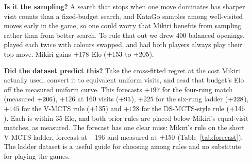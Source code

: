 \documentclass{article}
\begin{document}
\textbf{Is it the sampling?} A search that stops when one move dominates has sharper visit counts than a fixed-budget search, and KataGo samples among well-visited moves early in the game, so one could worry that Mikiri benefits from sampling rather than from better search. To rule that out we drew 400 balanced openings, played each twice with colours swapped, and had both players always play their top move. Mikiri gains $+178$ Elo ($+153$ to $+205$).

\textbf{Did the dataset predict this?} Take the cross-fitted regret at the cost Mikiri actually used, convert it to equivalent uniform visits, and read that budget's Elo off the measured uniform curve. This forecasts $+197$ for the four-rung match (measured $+206$), $+126$ at 160 visits ($+93$), $+225$ for the six-rung ladder ($+228$), $+145$ for the V-MCTS rule ($+135$) and $+128$ for the DS-MCTS-style rule ($+146$). Each is within 35 Elo, and both prior rules are placed below Mikiri's equal-visit matches, as measured. The forecast has one clear miss: Mikiri's rule on the short V-MCTS ladder, forecast at $+196$ and measured at $+150$ (Table~\ref{tab:forecast}). The ladder dataset is a useful guide for choosing among rules and no substitute for playing the games.

\begin{table}[t]
\centering\footnotesize
\setlength{\tabcolsep}{2pt}

\caption{Elo forecast from the ladder dataset against Elo measured in play, versus KataGo at 200 visits.}
\label{tab:forecast}
\end{table}
\end{document}
